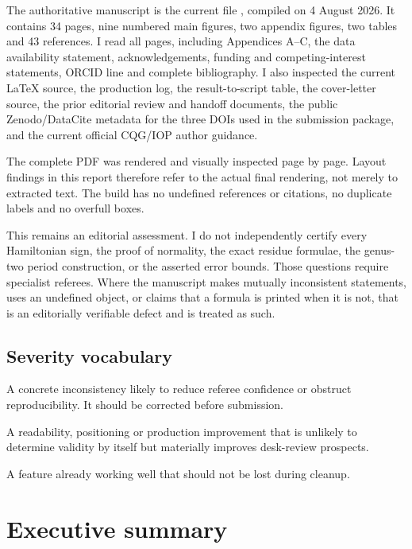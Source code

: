 \documentclass[11pt,a4paper]{article}
\newcommand{\must}{\textcolor{DarkRed}{\textbf{Must fix}}}
\newcommand{\should}{\textcolor{Amber}{\textbf{Should fix}}}
\newcommand{\preserve}{\textcolor{DarkGreen}{\textbf{Preserve}}}
\begin{document}
The authoritative manuscript is the current file , compiled on
4 August 2026. It contains 34 pages, nine numbered main figures, two appendix figures,
two tables and 43 references. I read all pages, including Appendices A--C, the data
availability statement, acknowledgements, funding and competing-interest statements,
ORCID line and complete bibliography. I also inspected the current \LaTeX{} source,
the production log, the result-to-script table, the cover-letter source, the prior
editorial review and handoff documents, the public Zenodo/DataCite metadata for the three
DOIs used in the submission package, and the current official CQG/IOP author guidance.

The complete PDF was rendered and visually inspected page by page. Layout findings in this
report therefore refer to the actual final rendering, not merely to extracted text. The
build has no undefined references or citations, no duplicate labels and no overfull boxes.

This remains an editorial assessment. I do not independently certify every Hamiltonian
sign, the proof of normality, the exact residue formulae, the genus-two period
construction, or the asserted error bounds. Those questions require specialist referees.
Where the manuscript makes mutually inconsistent statements, uses an undefined object,
or claims that a formula is printed when it is not, that is an editorially verifiable
defect and is treated as such.

\subsection*{Severity vocabulary}

\begin{description}[leftmargin=2.1cm,style=nextline]
  \item[\must] A concrete inconsistency likely to reduce referee confidence or obstruct
  reproducibility. It should be corrected before submission.
  \item[\should] A readability, positioning or production improvement that is unlikely to
  determine validity by itself but materially improves desk-review prospects.
  \item[\preserve] A feature already working well that should not be lost during cleanup.
\end{description}

\clearpage
\section{Executive summary}
\end{document}
